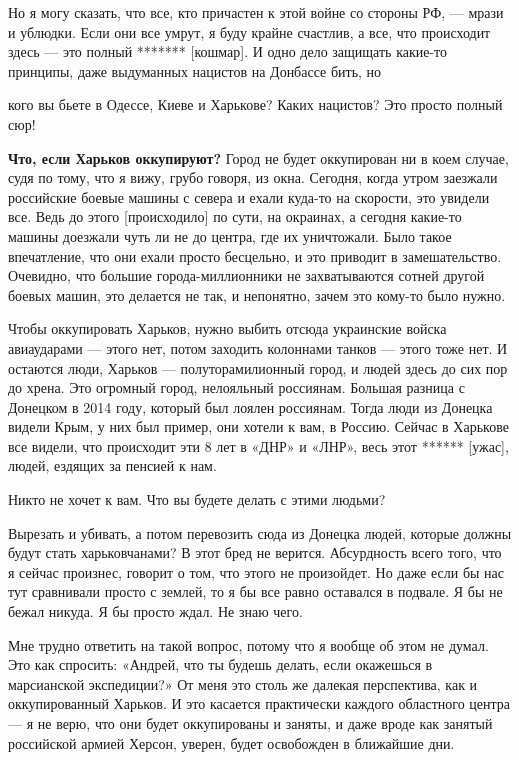 Но я могу сказать, что все, кто причастен к этой войне со стороны РФ, — мрази и ублюдки. Если они все умрут, я буду крайне счастлив, а все, что происходит здесь — это полный ******* [кошмар]. И одно дело защищать какие-то принципы, даже выдуманных нацистов на Донбассе бить, но

\begin{fancyquotes}
    кого вы бьете в Одессе, Киеве и Харькове? Каких нацистов? Это просто полный сюр!
\end{fancyquotes}

\textbf{Что, если Харьков оккупируют?}
Город не будет оккупирован ни в коем случае, судя по тому, что я вижу, грубо говоря, из окна. Сегодня, когда утром заезжали российские боевые машины с севера и ехали куда-то на скорости, это увидели все. Ведь до этого [происходило] по сути, на окраинах, а сегодня какие-то машины доезжали чуть ли не до центра, где их уничтожали. Было такое впечатление, что они ехали просто бесцельно, и это приводит в замешательство. Очевидно, что большие города-миллионники не захватываются сотней другой боевых машин, это делается не так, и непонятно, зачем это кому-то было нужно.

Чтобы оккупировать Харьков, нужно выбить отсюда украинские войска авиаударами — этого нет, потом заходить колоннами танков — этого тоже нет. И остаются люди, Харьков — полуторамилионный город, и людей здесь до сих пор до хрена. Это огромный город, нелояльный россиянам. Большая разница с Донецком в 2014 году, который был лоялен россиянам. Тогда люди из Донецка видели Крым, у них был пример, они хотели к вам, в Россию. Сейчас в Харькове все видели, что происходит эти 8 лет в «ДНР» и «ЛНР», весь этот ****** [ужас], людей, ездящих за пенсией к нам.

\begin{fancyquotes}
    Никто не хочет к вам. Что вы будете делать с этими людьми?
\end{fancyquotes}

Вырезать и убивать, а потом перевозить сюда из Донецка людей, которые должны будут стать харьковчанами? В этот бред не верится. Абсурдность всего того, что я сейчас произнес, говорит о том, что этого не произойдет. Но даже если бы нас тут сравнивали просто с землей, то я бы все равно оставался в подвале. Я бы не бежал никуда. Я бы просто ждал. Не знаю чего.

Мне трудно ответить на такой вопрос, потому что я вообще об этом не думал. Это как спросить: «Андрей, что ты будешь делать, если окажешься в марсианской экспедиции?» От меня это столь же далекая перспектива, как и оккупированный Харьков. И это касается практически каждого областного центра — я не верю, что они будет оккупированы и заняты, и даже вроде как занятый российской армией Херсон, уверен, будет освобожден в ближайшие дни.

